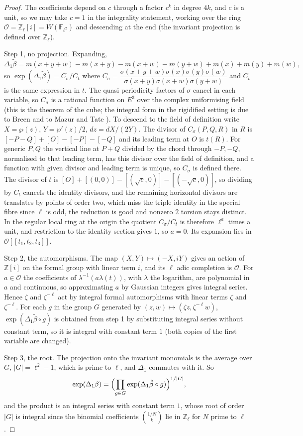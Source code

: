 \begin{proof}
The coefficients depend on $c$ through a factor $c^k$ in degree $4k$, and $c$ is a unit, so we may take $c=1$ in the integrality statement, working over the ring $\mathcal O=\mathbb Z_\ell[i]=W(\mathbb F_{\ell^2})$ and descending at the end (the invariant projection is defined over $\mathbb Z_\ell$).

Step 1, no projection. Expanding,
\[
\Delta_1\tilde\beta=m(x+y+w)-m(x+y)-m(x+w)-m(y+w)+m(x)+m(y)+m(w),
\]
so $\exp(\Delta_1\tilde\beta)=C_\sigma/C_t$ where $C_\sigma=\dfrac{\sigma(x+y+w)\sigma(x)\sigma(y)\sigma(w)}{\sigma(x+y)\sigma(x+w)\sigma(y+w)}$ and $C_t$ is the same expression in $t$. The quasi periodicity factors of $\sigma$ cancel in each variable, so $C_\sigma$ is a rational function on $E^3$ over the complex uniformising field (this is the theorem of the cube; the integral form in the rigidified setting is due to Breen and to Mazur and Tate \cite{Breen83,MazurTate91}). To descend to the field of definition write $X=\wp(z)$, $Y=\wp'(z)/2$, $dz=dX/(2Y)$. The divisor of $C_\sigma(P,Q,R)$ in $R$ is $[-P-Q]+[O]-[-P]-[-Q]$ and its leading term at $O$ is $t(R)$. For generic $P,Q$ the vertical line at $P+Q$ divided by the chord through $-P,-Q$, normalised to that leading term, has this divisor over the field of definition, and a function with given divisor and leading term is unique, so $C_\sigma$ is defined there. The divisor of $t$ is $[O]+[(0,0)]-[(\sqrt c,0)]-[(-\sqrt c,0)]$, so dividing by $C_t$ cancels the identity divisors, and the remaining horizontal divisors are translates by points of order two, which miss the triple identity in the special fibre since $\ell$ is odd, the reduction is good and nonzero $2$ torsion stays distinct. In the regular local ring at the origin the quotient $C_\sigma/C_t$ is therefore $\ell^a$ times a unit, and restriction to the identity section gives $1$, so $a=0$. Its expansion lies in $\mathcal O[[t_1,t_2,t_3]]$.

Step 2, the automorphisms. The map $(X,Y)\mapsto(-X,iY)$ gives an action of $\mathbb Z[i]$ on the formal group with linear term $i$, and its $\ell$ adic completion is $\mathcal O$. For $a\in\mathcal O$ the coefficients of $\lambda^{-1}(a\lambda(t))$, with $\lambda$ the logarithm, are polynomial in $a$ and continuous, so approximating $a$ by Gaussian integers gives integral series. Hence $\zeta$ and $\zeta^{-\ell}$ act by integral formal automorphisms with linear terms $\zeta$ and $\zeta^{-\ell}$. For each $g$ in the group $G$ generated by $(z,w)\mapsto(\zeta z,\zeta^{-\ell}w)$, $\exp(\Delta_1\tilde\beta\circ g)$ is obtained from step 1 by substituting integral series without constant term, so it is integral with constant term $1$ (both copies of the first variable are changed).

Step 3, the root. The projection onto the invariant monomials is the average over $G$, $|G|=\ell^2-1$, which is prime to $\ell$, and $\Delta_1$ commutes with it. So
\[
\exp(\Delta_1\beta)=\Bigl(\prod_{g\in G}\exp(\Delta_1\tilde\beta\circ g)\Bigr)^{1/|G|},
\]
and the product is an integral series with constant term $1$, whose root of order $|G|$ is integral since the binomial coefficients $\binom{1/N}{k}$ lie in $\mathbb Z_\ell$ for $N$ prime to $\ell$.
\end{proof}

